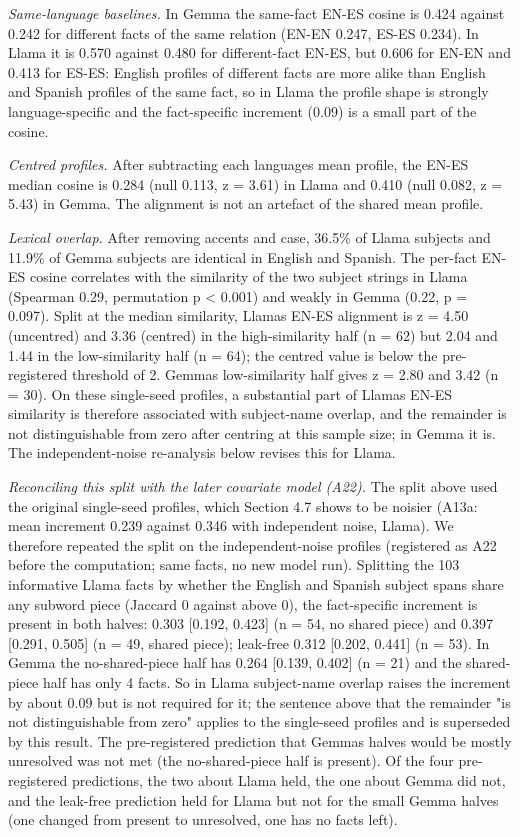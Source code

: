 \documentclass[11pt]{article}
\begin{document}
\emph{Same-language baselines.} In Gemma the same-fact EN-ES cosine is 0.424 against 0.242 for different facts of the same relation (EN-EN 0.247, ES-ES 0.234). In Llama it is 0.570 against 0.480 for different-fact EN-ES, but 0.606 for EN-EN and 0.413 for ES-ES: English profiles of different facts are more alike than English and Spanish profiles of the same fact, so in Llama the profile shape is strongly language-specific and the fact-specific increment (0.09) is a small part of the cosine.

\emph{Centred profiles.} After subtracting each language\textquotesingle s mean profile, the EN-ES median cosine is 0.284 (null 0.113, z = 3.61) in Llama and 0.410 (null 0.082, z = 5.43) in Gemma. The alignment is not an artefact of the shared mean profile.

\emph{Lexical overlap.} After removing accents and case, 36.5\% of Llama subjects and 11.9\% of Gemma subjects are identical in English and Spanish. The per-fact EN-ES cosine correlates with the similarity of the two subject strings in Llama (Spearman 0.29, permutation p \textless{} 0.001) and weakly in Gemma (0.22, p = 0.097). Split at the median similarity, Llama\textquotesingle s EN-ES alignment is z = 4.50 (uncentred) and 3.36 (centred) in the high-similarity half (n = 62) but 2.04 and 1.44 in the low-similarity half (n = 64); the centred value is below the pre-registered threshold of 2. Gemma\textquotesingle s low-similarity half gives z = 2.80 and 3.42 (n = 30). On these single-seed profiles, a substantial part of Llama\textquotesingle s EN-ES similarity is therefore associated with subject-name overlap, and the remainder is not distinguishable from zero after centring at this sample size; in Gemma it is. The independent-noise re-analysis below revises this for Llama.

\emph{Reconciling this split with the later covariate model (A22).} The split above used the original single-seed profiles, which Section 4.7 shows to be noisier (A13a: mean increment 0.239 against 0.346 with independent noise, Llama). We therefore repeated the split on the independent-noise profiles (registered as A22 before the computation; same facts, no new model run). Splitting the 103 informative Llama facts by whether the English and Spanish subject spans share any subword piece (Jaccard 0 against above 0), the fact-specific increment is present in both halves: 0.303 {[}0.192, 0.423{]} (n = 54, no shared piece) and 0.397 {[}0.291, 0.505{]} (n = 49, shared piece); leak-free 0.312 {[}0.202, 0.441{]} (n = 53). In Gemma the no-shared-piece half has 0.264 {[}0.139, 0.402{]} (n = 21) and the shared-piece half has only 4 facts. So in Llama subject-name overlap raises the increment by about 0.09 but is not required for it; the sentence above that the remainder "is not distinguishable from zero" applies to the single-seed profiles and is superseded by this result. The pre-registered prediction that Gemma\textquotesingle s halves would be mostly unresolved was not met (the no-shared-piece half is present). Of the four pre-registered predictions, the two about Llama held, the one about Gemma did not, and the leak-free prediction held for Llama but not for the small Gemma halves (one changed from present to unresolved, one has no facts left).
\end{document}
